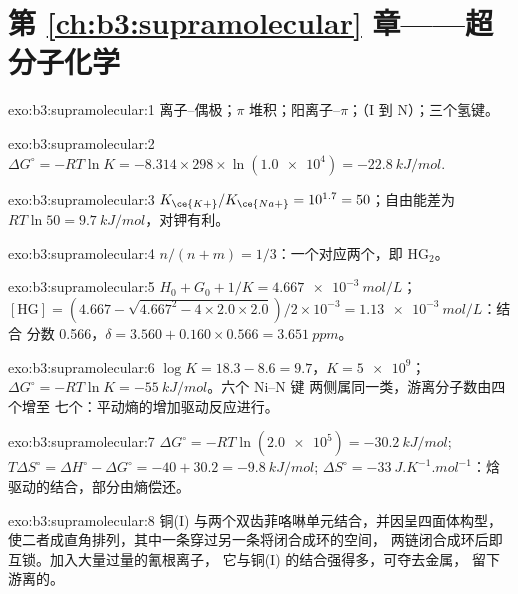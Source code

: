 \section*{第 \ref{ch:b3:supramolecular} 章——超分子化学}

\begin{solution}{exo:b3:supramolecular:1}
离子–偶极；$\pi$ 堆积；阳离子--$\pi$；（I 到 N）；三个氢键。
\end{solution}

\begin{solution}{exo:b3:supramolecular:2}
$\Delta G^\circ = -RT\ln K = -8.314 \times 298 \times \ln(\num{1.0e4}) = \qty{-22.8}{kJ/mol}$.
\end{solution}

\begin{solution}{exo:b3:supramolecular:3}
$K_{\ce{K+}}/K_{\ce{Na+}} = 10^{1.7} = 50$；自由能差为 $RT\ln 50 = \qty{9.7}{kJ/mol}$，对钾有利。
\end{solution}

\begin{solution}{exo:b3:supramolecular:4}
$n/(n + m) = 1/3$：一个对应两个，即 $\mathrm{HG_2}$。
\end{solution}

\begin{solution}{exo:b3:supramolecular:5}
$H_0 + G_0 + 1/K = \qty{4.667e-3}{mol/L}$；$[\mathrm{HG}] = (4.667 - \sqrt{4.667^2 - 4 \times 2.0 \times 2.0})/2 \times 10^{-3} = \qty{1.13e-3}{mol/L}$：结合
分数 0.566，$\delta = 3.560 + 0.160 \times 0.566 = \qty{3.651}{ppm}$。
\end{solution}

\begin{solution}{exo:b3:supramolecular:6}
$\log K = 18.3 - 8.6 = 9.7$，$K = \num{5e9}$；$\Delta G^\circ = -RT\ln K = \qty{-55}{kJ/mol}$。六个 Ni--N 键
两侧属同一类，游离分子数由四个增至
七个：平动熵的增加驱动反应进行。
\end{solution}

\begin{solution}{exo:b3:supramolecular:7}
$\Delta G^\circ = -RT\ln(\num{2.0e5}) = \qty{-30.2}{kJ/mol}$; $T\Delta S^\circ = \Delta H^\circ - \Delta G^\circ = -40 + 30.2 = \qty{-9.8}{kJ/mol}$;
$\Delta S^\circ = \qty{-33}{J.K^{-1}.mol^{-1}}$：焓驱动的结合，部分由熵偿还。
\end{solution}

\begin{solution}{exo:b3:supramolecular:8}
铜(I) 与两个双齿菲咯啉单元结合，并因呈四面体构型，
使二者成直角排列，其中一条穿过另一条将闭合成环的空间，
两链闭合成环后即互锁。加入大量过量的氰根离子，
它与铜(I) 的结合强得多，可夺去金属，
留下游离的。
\end{solution}

